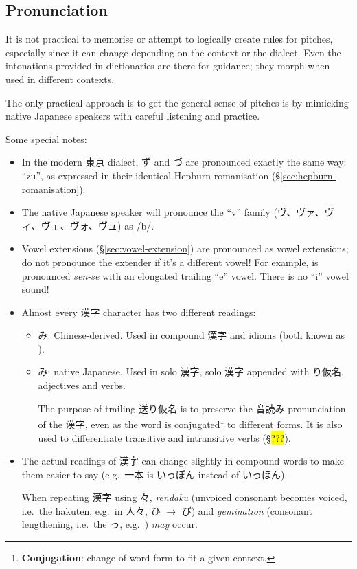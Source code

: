 \documentclass[../nihongo-gakushuu-kyouzai.tex]{subfiles}
\begin{document}
\subsection{Pronunciation} \label{sec:pronunciation}
It is not practical to memorise or attempt to logically create rules for pitches, especially since it can change depending on the context or the dialect. Even the intonations provided in dictionaries are there for guidance; they morph when used in different contexts.

The only practical approach is to get the general sense of pitches is by mimicking native Japanese speakers with careful listening and practice.

Some special notes:
\begin{itemize}
    \item In the modern 東京 dialect, ず and づ are pronounced exactly the same way: ``zu'', as expressed in their identical Hepburn romanisation (\S\ref{sec:hepburn-romanisation}).
    \item The native Japanese speaker will pronounce the ``v'' family (ヴ、ヴァ、ヴィ、ヴェ、ヴォ、ヴュ) as /b/.
    \item Vowel extensions (\S\ref{sec:vowel-extension}) are pronounced as vowel extensions; do not pronounce the extender if it's a different vowel! For example,  is pronounced \emph{sen-se} with an elongated trailing ``e'' vowel. There is no ``i'' vowel sound!
    \item Almost every 漢字 character has two different readings:
    \begin{itemize}
        \item {}み: Chinese-derived. Used in compound 漢字 and idioms (both known as ).
        \item {}み: native Japanese. Used in solo 漢字, solo 漢字 appended with り仮名, adjectives and verbs.

        The purpose of trailing 送り仮名 is to preserve the 音読み pronunciation of the 漢字, even as the word is conjugated\footnote{\textbf{Conjugation}: change of word form to fit a given context.} to different forms. It is also used to differentiate transitive and intransitive verbs (\S\hl{???}).  %
    \end{itemize}
    \item The actual readings of 漢字 can change slightly in compound words to make them easier to say (e.g.\ 一本 is いっぽん instead of いっほん).

    When repeating 漢字 using 々, \emph{rendaku} (unvoiced consonant becomes voiced, i.e.\ the hakuten, e.g.\ in 人々, ひ $\to$ び) and \emph{gemination} (consonant lengthening, i.e.\ the っ, e.g.\ ) \emph{may} occur.
\end{itemize}
\end{document}
